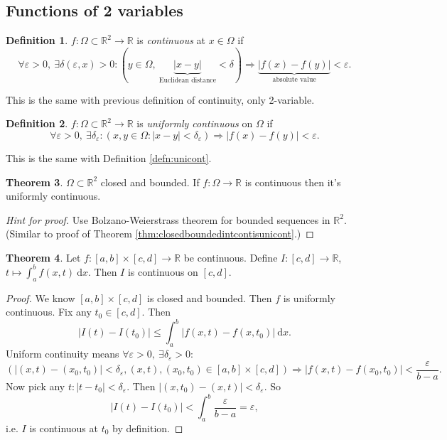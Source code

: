 \documentclass[a4paper]{article}
\theoremstyle{definition}
\newtheorem{defn}{Definition}[subsection]
\newtheorem{thm}[defn]{Theorem}
\begin{document}
\subsection{Functions of 2 variables}
\begin{defn}
$f:\Omega \subset \mathbb R^2 \rightarrow \mathbb R$ is \textit{continuous} at $x\in \Omega$ if
\[
\forall \varepsilon >0,\ \exists \delta(\varepsilon ,x)>0: (y\in \Omega,\ \underbrace{|x-y|}_{\text{Euclidean distance}}<\delta ) \Rightarrow \underbrace{|f(x)-f(y)|}_{\text{absolute value}}<\varepsilon .
\]
\end{defn}
This is the same with previous definition of continuity, only 2-variable.
\begin{defn}
$f:\Omega \subset \mathbb R^2 \rightarrow \mathbb R$ is \textit{uniformly continuous} on $\Omega$ if
\[
\forall \varepsilon >0,\ \exists \delta_\varepsilon : (x,y\in \Omega: |x-y|<\delta_\varepsilon) \Rightarrow |f(x)-f(y)|<\varepsilon .
\]
\end{defn}
This is the same with Definition \ref{defn:unicont}.
\begin{thm}
$\Omega \subset \mathbb R^2$ closed and bounded. If $f:\Omega \rightarrow \mathbb R$ is continuous then it's uniformly continuous.
\end{thm}
\begin{proof}[Hint for proof]
Use Bolzano-Weierstrass theorem for bounded sequences in $\mathbb R^2$. (Similar to proof of Theorem \ref{thm:closedboundedintcontisunicont}.)
\end{proof}
\begin{thm}
\label{thm:partintofcontiscont}
Let $f:[a,b]\times [c,d]\rightarrow \mathbb R$ be continuous. Define $I:[c,d] \rightarrow \mathbb R$, $t\mapsto \int_a^b  f(x,t) \ \mathrm d x.$ Then $I$ is continuous on $[c,d]$.
\end{thm}
\begin{proof}
We know $[a,b]\times [c,d]$ is closed and bounded. Then $f$ is uniformly continuous. Fix any $t_0\in [c,d]$. Then
\[
|I(t)-I(t_0)|\leq \int_a^b |f(x,t)-f(x,t_0)| \ \mathrm d x .
\]
Uniform continuity means $\forall \varepsilon >0,\ \exists \delta_\varepsilon >0 : $
\[
(|(x,t)-(x_0,t_0)|<\delta_\varepsilon, (x,t),(x_0,t_0)\in [a,b]\times [c,d])\Rightarrow |f(x,t)-f(x_0,t_0)| <\frac{\varepsilon}{b-a} .
\]
Now pick any $t:|t-t_0|<\delta_\varepsilon$. Then $|(x,t_0)-(x,t)|<\delta_\varepsilon$. So
\[
|I(t)-I(t_0)| < \int_a^b \frac{\varepsilon}{b-a}=\varepsilon,
\]
i.e. $I$ is continuous at $t_0$ by definition.
\end{proof}
\end{document}
